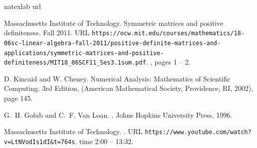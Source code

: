 \documentclass[11pt]{article}
\theoremstyle{definition}
\begin{document}
\pagebreak

\begin{thebibliography}{9}
\expandafter\ifx\csname natexlab\endcsname\relax\def\natexlab#1{#1}\fi
\expandafter\ifx\csname url\endcsname\relax
  \def\url#1{{\tt #1}}\fi

Massachusetts Institute of Technology.
\newblock Symmetric matrices and positive definiteness.
\newblock Fall 2011.
\newblock URL \url{https://ocw.mit.edu/courses/mathematics/18-06sc-linear-algebra-fall-2011/positive-definite-matrices-and-applications/symmetric-matrices-and-positive-definiteness/MIT18\_06SCF11\_Ses3.1sum.pdf}.
\newblock [20/4/2020], pages 1 -- 2.

D. Kincaid and W. Cheney.
\newblock Numerical Analysis: Mathematics of Scientific Computing.
\newblock 3rd Edition, (American Mathematical Society, Providence, RI, 2002), page 145.
  
G.~H. Golub and C.~F. {Van Loan}.
.
\newblock Johns Hopkins University Press, 1996.

Massachusetts Institute of Technology.
.
\newblock URL \url{https://www.youtube.com/watch?v=LtNVodIs1dI&t=764s}.
\newblock time 2:00 -- 13:32.
\end{thebibliography}
\end{document}
